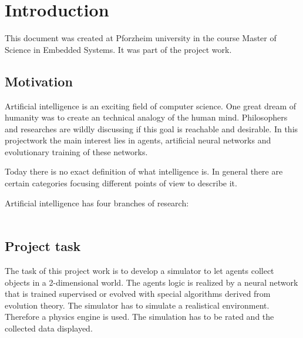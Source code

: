 \documentclass[10pt,a4paper,DIV=11]{scrreprt}
\begin{document}
\chapter{Introduction}
This document was created at Pforzheim university in the course Master of Science in Embedded Systems.
It was part of the project work.

\section{Motivation}
Artificial intelligence is an exciting field of computer science. One great dream of humanity was to create an technical analogy of the human mind.
Philosophers and researches are wildly discussing if this goal is reachable and desirable.
In this projectwork the main interest lies in agents, artificial neural networks and evolutionary training of these networks.

Today there is no exact definition of what intelligence is.
In general there are certain categories focusing different points of view to describe it.


Artificial intelligence has four branches of research: \\

   \\

\section{Project task}
The task of this project work is to develop a simulator to let agents collect objects in a 2-dimensional world. The agents logic is realized  by a neural network that is trained supervised or evolved with special algorithms derived from evolution theory.
The simulator has to simulate a realistical environment. Therefore a physics engine is used.
The simulation has to be rated and the collected data displayed. \\
\end{document}
